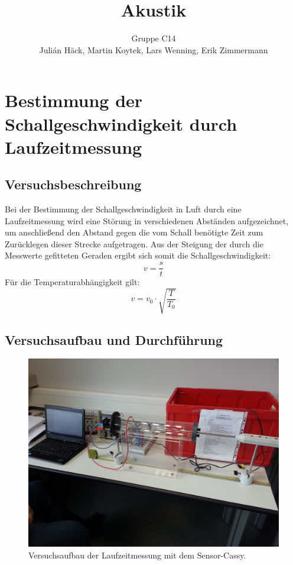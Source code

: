 \documentclass[12pt,a4paper]{article}
\author{Gruppe C14 \\ Julián Häck, Martin Koytek, Lars Wenning, Erik Zimmermann}
\title{Akustik}
\begin{document}
\maketitle
\newpage
\tableofcontents
\newpage
\section{Bestimmung der Schallgeschwindigkeit durch Laufzeitmessung}
\subsection{Versuchsbeschreibung}
Bei der Bestimmung der Schallgeschwindigkeit in Luft durch eine Laufzeitmessung wird eine Störung in verschiedenen Abständen aufgezeichnet, um anschließend den Abstand gegen die vom Schall benötigte Zeit zum Zurücklegen dieser Strecke aufgetragen. Aus der Steigung der durch die Messwerte gefitteten Geraden ergibt sich somit die Schallgeschwindigkeit:
\begin{equation}
v=\frac{s}{t}
\end{equation}
Für die Temperaturabhängigkeit gilt:
\begin{equation}
v=v_0\cdot \sqrt{\frac{T}{T_0}} \label{Temperaturabhängigkeit}
\end{equation} 
\subsection{Versuchsaufbau und Durchführung}
\begin{figure}[H]
\centering
\includegraphics[scale=0.15]{Bilder/laufzeit-cassy.jpg}
\caption{Versuchsaufbau der Laufzeitmessung mit dem Sensor-Cassy.}
\end{figure}
\end{document}
